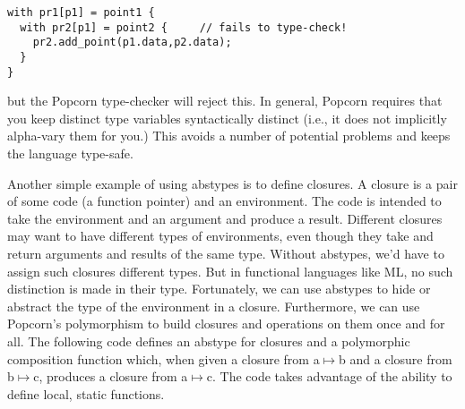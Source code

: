 \documentclass[titlepage,10pt]{article}
\begin{document}
\begin{verbatim}
with pr1[p1] = point1 {
  with pr2[p1] = point2 {     // fails to type-check!
    pr2.add_point(p1.data,p2.data);  
  }
}
\end{verbatim}

but the Popcorn type-checker will reject this.  In general, Popcorn
requires that you keep distinct type variables syntactically distinct
(i.e., it does not implicitly alpha-vary them for you.)  This avoids a
number of potential problems and keeps the language type-safe.

Another simple example of using abstypes is to define closures.  A
closure is a pair of some code (a function pointer) and an environment.
The code is intended to take the environment and an argument and produce
a result.  Different closures may want to have different types of
environments, even though they take and return arguments and results of
the same type.  Without abstypes, we'd have to assign such closures
different types.  But in functional languages like ML, no such
distinction is made in their type.  Fortunately, we can use abstypes to
hide or abstract the type of the environment in a closure.  Furthermore,
we can use Popcorn's polymorphism to build closures and operations on
them once and for all.  The following code defines an abstype for
closures and a polymorphic composition function which, when given a
closure from a$\mapsto$b and a closure from b$\mapsto$c, produces a
closure from a$\mapsto$c.  The code takes advantage of the ability to
define local, static functions.

\end{document}
